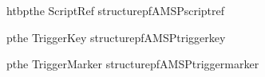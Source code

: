 \begin{datastructure}{htbp}{the ScriptRef structure}{pfAMSPscriptref}
\end{datastructure}

\begin{datastructure}{p}{the TriggerKey structure}{pfAMSPtriggerkey}
\end{datastructure}

\begin{datastructure}{p}{the TriggerMarker structure}{pfAMSPtriggermarker}
\end{datastructure}

\clearpage

